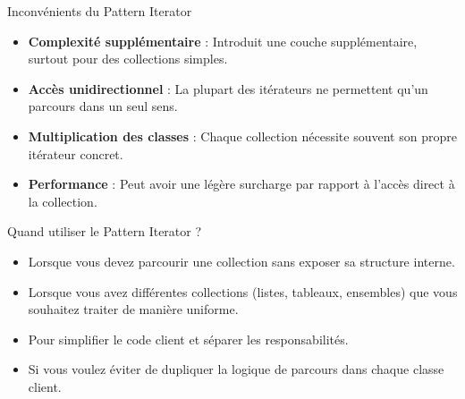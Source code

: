 \documentclass[aspectratio=169]{beamer}
\begin{document}
  \begin{frame}{Inconvénients du Pattern Iterator}
    \begin{itemize}
        \item \textbf{Complexité supplémentaire} : Introduit une couche supplémentaire, surtout pour des collections simples.
        \item \textbf{Accès unidirectionnel} : La plupart des itérateurs ne permettent qu'un parcours dans un seul sens.
        \item \textbf{Multiplication des classes} : Chaque collection nécessite souvent son propre itérateur concret.
        \item \textbf{Performance} : Peut avoir une légère surcharge par rapport à l'accès direct à la collection.
    \end{itemize}
  \end{frame}

  \begin{frame}{Quand utiliser le Pattern Iterator ?}
    \begin{itemize}
        \item Lorsque vous devez parcourir une collection sans exposer sa structure interne.
        \item Lorsque vous avez différentes collections (listes, tableaux, ensembles) que vous souhaitez traiter de manière uniforme.
        \item Pour simplifier le code client et séparer les responsabilités.
        \item Si vous voulez éviter de dupliquer la logique de parcours dans chaque classe client.
    \end{itemize}
  \end{frame}
\end{document}

